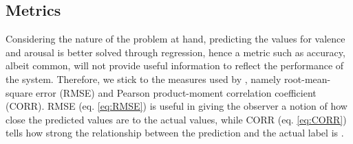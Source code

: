 


\subsection{Metrics} \label{sec:Metrics}
Considering the nature of the problem at hand, predicting the values for valence and arousal is better solved through regression, hence a metric such as accuracy, albeit common, will not provide useful information to reflect the performance of the system. Therefore, we stick to the measures used by \citet{Kossaifi:2017:AFEW-VADatabase}, namely root-mean-square error (RMSE) and Pearson product-moment correlation coefficient (CORR). 
\newline\newline
RMSE (eq. \ref{eq:RMSE}) is useful in giving the observer a notion of how close the predicted values are to the actual values, while CORR (eq. \ref{eq:CORR}) tells how strong the relationship between the prediction and the actual label is \citep{2020:RMSE} \citep{2020:PearsonCorrelation}.
  
